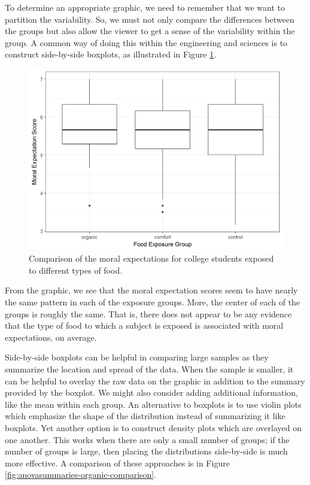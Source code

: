 \documentclass[]{book}
\theoremstyle{definition}
\theoremstyle{definition}
\theoremstyle{remark}
\begin{document}
To determine an appropriate graphic, we need to remember that we want to
partition the variability. So, we must not only compare the differences
between the groups but also allow the viewer to get a sense of the
variability within the group. A common way of doing this within the
engineering and sciences is to construct side-by-side boxplots, as
illustrated in Figure \ref{fig:anovasummaries-organic-boxplot}.

\begin{figure}

{\centering \includegraphics[width=0.8\linewidth]{./Images/anovasummaries-organic-boxplot-1} 

}

\caption{Comparison of the moral expectations for college students exposed to different types of food.}\label{fig:anovasummaries-organic-boxplot}
\end{figure}

From the graphic, we see that the moral expectation scores seem to have
nearly the same pattern in each of the exposure groups. More, the center
of each of the groups is roughly the same. That is, there does not
appear to be any evidence that the type of food to which a subject is
exposed is associated with moral expectations, on average.

Side-by-side boxplots can be helpful in comparing large samples as they
summarize the location and spread of the data. When the sample is
smaller, it can be helpful to overlay the raw data on the graphic in
addition to the summary provided by the boxplot. We might also consider
adding additional information, like the mean within each group. An
alternative to boxplots is to use violin plots which emphasize the shape
of the distribution instead of summarizing it like boxplots. Yet another
option is to construct density plots which are overlayed on one another.
This works when there are only a small number of groups; if the number
of groups is large, then placing the distributions side-by-side is much
more effective. A comparison of these approaches is in Figure
\ref{fig:anovasummaries-organic-comparison}.
\end{document}
